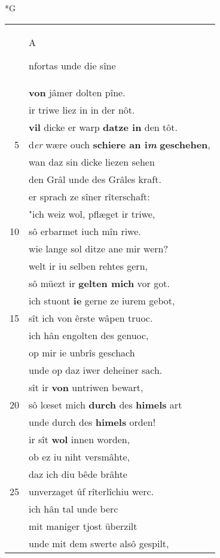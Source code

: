 \documentclass[8pt,a4paper,notitlepage]{article}
\begin{document}
\begin{table}[ht]
\begin{minipage}[t]{0.5\linewidth}
\small
\begin{center}*G
\end{center}
\begin{tabular}{rl}
 & \begin{large}A\end{large}nfortas unde die sîne\\ 
 & \textbf{von} jâmer dolten pîne.\\ 
 & ir triwe liez in in der nôt.\\ 
 & \textbf{vil} dicke er warp \textbf{datze in} den tôt.\\ 
5 & d\textit{er} wære ouch \textbf{schiere an i\textit{m}} \textbf{geschehen},\\ 
 & wan daz sin dicke liezen sehen\\ 
 & den Grâl unde des Grâles kraft.\\ 
 & er sprach ze sîner rîterschaft:\\ 
 & "ich weiz wol, pflæget ir triwe,\\ 
10 & sô erbarmet iuch mîn riwe.\\ 
 & wie lange sol ditze ane mir wern?\\ 
 & welt ir iu selben rehtes gern,\\ 
 & sô müezt ir \textbf{gelten mich} vor got.\\ 
 & ich stuont \textbf{ie} gerne ze iurem gebot,\\ 
15 & sît ich von êrste wâpen truoc.\\ 
 & ich hân engolten des genuoc,\\ 
 & op mir ie unbrîs geschach\\ 
 & unde op daz iwer deheiner sach.\\ 
 & sît ir \textbf{von} untriwen bewart,\\ 
20 & sô lœset mich \textbf{durch} des \textbf{himels} art\\ 
 & unde durch des \textbf{himels} orden!\\ 
 & ir sît \textbf{wol} innen worden,\\ 
 & ob ez iu niht versmâhte,\\ 
 & daz ich diu bêde brâhte\\ 
25 & unverzaget ûf rîterlîchiu werc.\\ 
 & ich hân tal unde berc\\ 
 & mit maniger tjost überzilt\\ 
 & unde mit dem swerte alsô gespilt,\\ 

\end{tabular}
\end{minipage}
\end{table}
\end{document}
